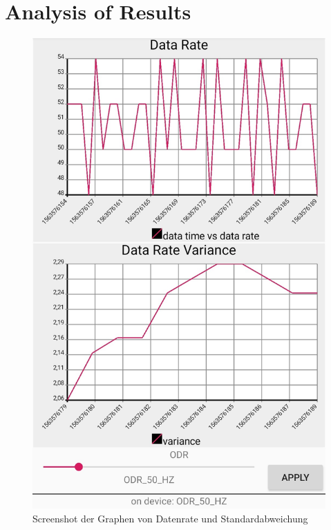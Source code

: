 \section{Analysis of Results}
\begin{figure}[hbtp]
	\centering
	\includegraphics[width=0.5\linewidth]{res/android.jpg}
	\caption{Screenshot der Graphen von Datenrate und Standardabweichung}
	\label{fig:android}
\end{figure}
